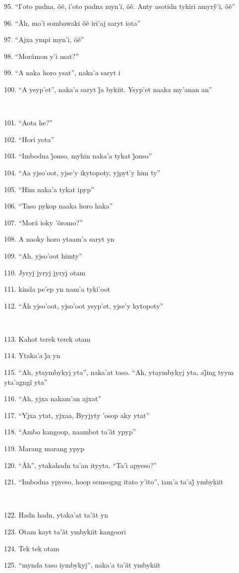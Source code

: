 95. “I’oto padna, õẽ, i’oto padna myn’i, õẽ. Anty asotidn tykiri amyrỹ’i, õẽ”

96. “Ãh, mo’i sombawaki õẽ iri’aj saryt iota”

97. “Ajxa ympi myn’i, õẽ”

98. ``Morãmon y'i asat?''

99. ``A naka horo ysat'', naka'a saryt i

100. “A ysyp’et”, naka’a saryt j̃a bykiit. Ysyp’et naaka my’anan an”

~

101. ``Aota he?''

102. ``Hori yota''

103. “Imbodna j̃onso, myhin naka’a tykat j̃onso”

104. ``Aa yjso'oot, yjse'y ikytopoty, yjpyt'y him ty''

105. ``Him naka'a tykat ipyp''

106. ``Taso pykop naaka horo haka''

107. ``Morã ioky 'õromo?''

108. A naoky horo ytaam'a saryt yn

109. ``Ah, yjso'oot himty''

110. Jyryj jyryj jyryj otam

111. kinda pe'ep yn nam'a tyki'oot

112. ``Ãh yjso'oot, yjso'oot ysyp'et, yjse'y kytopoty''

~

113. Kahot terek terek otam

114. Ytaka’a j̃a yn

115. “Ah, ytaymbykyj yta”, naka’at taso. “Ah, ytaymbykyj yta, aj̃ing tyym yta’agngĩ yta”

116. ``Ah, yjxa nakam'an ajxat''

117. ``Yjxa ytat, yjxaa, Byyjyty 'osop aky ytat''

118. ``Ambo kangoop, naambot ta'ãt ypyp''

119. Marang marang ypyp

120. ``Ãh'', ytakahadn ta'an ityyta. ``Ta'i apyeso?''

121. “Imbodna ypyeso, hoop semsogng itato y’ito”, iam’a ta’aj̃ ymbykiit

~

122. Hadn hadn, ytaka'at ta'ãt yn

123. Otam kayt ta'ãt ymbykiit kangoori

124. Tek tek otam

125. ``mynda taso iymbykyj'', naka'a ta'ãt ymbykiit

